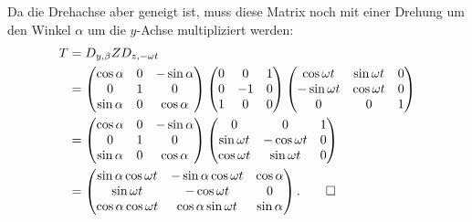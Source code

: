 \begin{loesung}
Da die Drehachse aber geneigt ist, muss diese Matrix noch mit einer
Drehung um den Winkel $\alpha$ um die $y$-Achse multipliziert werden:
\begin{align*}
T&=
D_{y,\beta}ZD_{z,-\omega t}\\
&=
\begin{pmatrix}
\cos\alpha&0&-\sin\alpha\\
     0    &1&     0     \\
\sin\alpha&0& \cos\alpha
\end{pmatrix}
\begin{pmatrix}
0& 0&1\\
0&-1&0\\
1& 0&0
\end{pmatrix}
\begin{pmatrix}
 \cos\omega t & \sin\omega t & 0\\
-\sin\omega t & \cos\omega t & 0\\
     0       &     0        & 1
\end{pmatrix}
\\
&=
\begin{pmatrix}
\cos\alpha&0&-\sin\alpha\\
     0    &1&     0     \\
\sin\alpha&0& \cos\alpha
\end{pmatrix}
\begin{pmatrix}
     0        &      0       & 1\\
 \sin\omega t &-\cos\omega t & 0\\
 \cos\omega t & \sin\omega t & 0
\end{pmatrix}
\\
&=
\begin{pmatrix}
\sin\alpha\cos\omega t & -\sin\alpha\cos\omega t &\cos\alpha\\
\sin\omega t           & -\cos\omega t           & 0\\
\cos\alpha\cos\omega t &  \cos\alpha\sin\omega t &\sin\alpha
\end{pmatrix}.
\qedhere
\end{align*}
\end{loesung}

